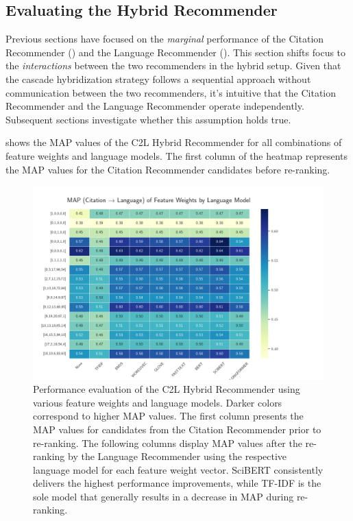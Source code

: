 \subsection{Evaluating the Hybrid Recommender} \label{sec:evaluation-hybrid-recommender}

Previous sections have focused on the \emph{marginal} performance of the Citation Recommender () and the Language Recommender (). This section shifts focus to the \emph{interactions} between the two recommenders in the hybrid setup.
Given that the cascade hybridization strategy follows a sequential approach without communication between the two recommenders, it's intuitive that the Citation Recommender and the Language Recommender operate independently.
Subsequent sections investigate whether this assumption holds true.

 shows the \ac{MAP} values of the \ac{C2L} Hybrid Recommender for all combinations of feature weights and language models. The first column of the heatmap represents the \ac{MAP} values for the Citation Recommender candidates before re-ranking.

\begin{figure}[htb!]
    \centering
    \includegraphics[width=\textwidth]{plots/language_models_feature_weights_heatmap_c_to_l.png}
    \caption[Performance Evaluation of the \acl{C2L} Hybrid Recommender]{Performance evaluation of the \ac{C2L} Hybrid Recommender using various feature weights and language models. Darker colors correspond to higher \ac{MAP} values. The first column presents the \ac{MAP} values for candidates from the Citation Recommender prior to re-ranking. The following columns display \ac{MAP} values after the re-ranking by the Language Recommender using the respective language model for each feature weight vector. SciBERT consistently delivers the highest performance improvements, while TF-IDF is the sole model that generally results in a decrease in \ac{MAP} during re-ranking.}
    \label{fig:language-models-feature-weights-heatmap-c2l}
\end{figure}

